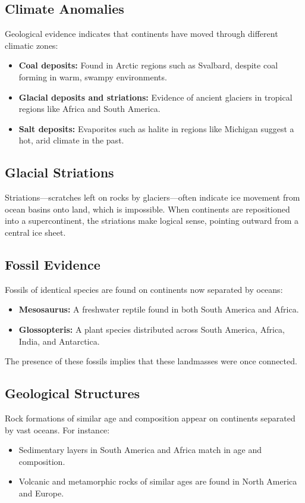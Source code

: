 \documentclass{article}
\begin{document}
\subsection{Climate Anomalies}

Geological evidence indicates that continents have moved through different climatic zones:
\begin{itemize}
    \item \textbf{Coal deposits:} Found in Arctic regions such as Svalbard, despite coal forming in warm, swampy environments.
    \item \textbf{Glacial deposits and striations:} Evidence of ancient glaciers in tropical regions like Africa and South America.
    \item \textbf{Salt deposits:} Evaporites such as halite in regions like Michigan suggest a hot, arid climate in the past.
\end{itemize}

\subsection{Glacial Striations}

Striations—scratches left on rocks by glaciers—often indicate ice movement from ocean basins onto land, which is impossible. When continents are repositioned into a supercontinent, the striations make logical sense, pointing outward from a central ice sheet.

\subsection{Fossil Evidence}

Fossils of identical species are found on continents now separated by oceans:
\begin{itemize}
    \item \textbf{Mesosaurus:} A freshwater reptile found in both South America and Africa.
    \item \textbf{Glossopteris:} A plant species distributed across South America, Africa, India, and Antarctica.
\end{itemize}
The presence of these fossils implies that these landmasses were once connected.

\subsection{Geological Structures}

Rock formations of similar age and composition appear on continents separated by vast oceans. For instance:
\begin{itemize}
    \item Sedimentary layers in South America and Africa match in age and composition.
    \item Volcanic and metamorphic rocks of similar ages are found in North America and Europe.
\end{itemize}
\end{document}
